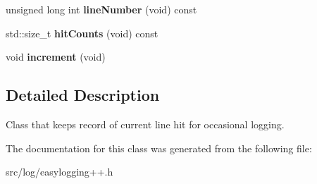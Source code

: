\begin{DoxyCompactItemize}
\item 
unsigned long int {\bfseries line\+Number} (void) const \hypertarget{classel_1_1base_1_1HitCounter_ab43602346f499854b1764b1c2dcb70dc}{}\label{classel_1_1base_1_1HitCounter_ab43602346f499854b1764b1c2dcb70dc}

\item 
std\+::size\+\_\+t {\bfseries hit\+Counts} (void) const \hypertarget{classel_1_1base_1_1HitCounter_a3df3a285c91b5eb690be48893d677e94}{}\label{classel_1_1base_1_1HitCounter_a3df3a285c91b5eb690be48893d677e94}

\item 
void {\bfseries increment} (void)\hypertarget{classel_1_1base_1_1HitCounter_ae2d7709a89362019195761416d510911}{}\label{classel_1_1base_1_1HitCounter_ae2d7709a89362019195761416d510911}

\end{DoxyCompactItemize}


\subsection{Detailed Description}
Class that keeps record of current line hit for occasional logging. 

The documentation for this class was generated from the following file\+:\begin{DoxyCompactItemize}
\item 
src/log/easylogging++.\+h\end{DoxyCompactItemize}

